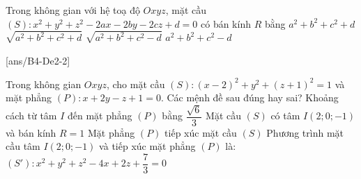 \begin{ex}%
	Trong không gian với hệ toạ độ $Oxyz$, mặt cầu  $(S)\colon x^2+y^2+z^2-2ax-2by-2cz+d=0$ có bán kính $R$ bằng
	\choice
	{$a^2+b^2+c^2+d$}
	{$\sqrt{a^2+b^2+c^2+d}$}
	{\True $\sqrt{a^2+b^2+c^2-d}$}
	{$a^2+b^2+c^2-d$}
\end{ex}

\TNTF
	\setcounter{ex}{0}
	[ans/B4-De2-2]
\begin{ex}%
	Trong không gian $Oxyz$, cho mặt cầu $(S): \left(x-2\right)^2+y^2+\left(z+1\right)^2=1$ và mặt phẳng $(P)\colon  x+2y-z+1=0$. Các mệnh đề sau đúng hay sai?
	\choiceTF
	{Khoảng cách từ tâm $I$ đến mặt phẳng $(P)$ bằng $\dfrac{\sqrt{6}}{3}$}
	{\True Mặt cầu $(S)$ có tâm $I\left(2;0;-1\right)$ và bán kính $R=1$}
	{Mặt phẳng $(P)$ tiếp xúc mặt cầu $(S)$}
	{\True Phương trình mặt cầu tâm $I\left(2;0;-1\right)$ và tiếp xúc mặt phẳng $(P)$ là: $\left(S'\right): x^2+y^2+z^2-4x+2z+\dfrac{7}{3}=0$}
\end{ex}

